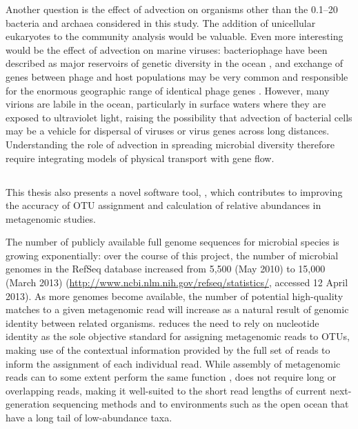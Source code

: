Another question is the effect of advection on organisms other than the 0.1--20 \micron{} bacteria and archaea considered in this study.
The addition of unicellular eukaryotes to the community analysis would be valuable.
Even more interesting would be the effect of advection on marine viruses: bacteriophage have been described as major reservoirs of genetic diversity in the ocean \cite{Suttle:2005bs}, and exchange of genes between phage and host populations may be very common and responsible for the enormous geographic range of identical phage genes \citep[reviewed in][]{Hambly:2005cm}.
However, many virions are labile in the ocean, particularly in surface waters where they are exposed to ultraviolet light, raising the possibility that advection of bacterial cells may be a vehicle for dispersal of viruses or virus genes across long distances.
Understanding the role of advection in spreading microbial diversity therefore require integrating models of physical transport with gene flow.

\subsection{}

This thesis also presents a novel software tool, , which contributes to improving the accuracy of \ac{OTU} assignment and calculation of relative abundances in metagenomic studies.

The number of publicly available full genome sequences for microbial species is growing exponentially: over the course of this project, the number of microbial genomes in the RefSeq database increased from 5,500 (May 2010) to 15,000 (March 2013) (\url{http://www.ncbi.nlm.nih.gov/refseq/statistics/}, accessed 12 April 2013).
As more genomes become available, the number of potential high-quality matches to a given metagenomic read will increase as a natural result of genomic identity between related organisms.
 reduces the need to rely on nucleotide identity as the sole objective standard for assigning metagenomic reads to \acp{OTU}, making use of the contextual information provided by the full set of reads to inform the assignment of each individual read.
While assembly of metagenomic reads can to some extent perform the same function \cite{Temperton:2012fj},  does not require long or overlapping reads, making it well-suited to the short read lengths of current next-generation sequencing methods and to environments such as the open ocean that have a long tail of low-abundance taxa.

